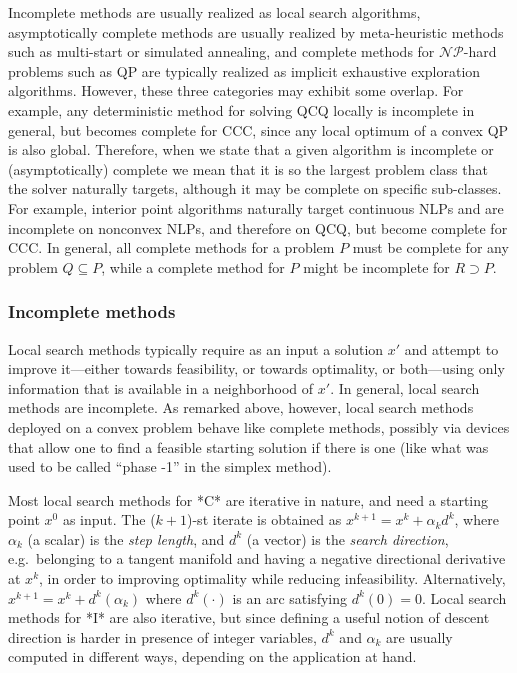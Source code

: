 Incomplete methods are usually realized as local search algorithms, asymptotically complete methods are usually realized by meta-heuristic methods such as multi-start or simulated annealing, and complete methods for $\mathcal{NP}$-hard problems such as QP are typically realized as implicit exhaustive exploration algorithms. However, these three categories may exhibit some overlap. For example, any deterministic method for solving QCQ locally is incomplete in general, but becomes complete for CCC, since any local optimum of a convex QP is also global. Therefore, when we state that a given algorithm is incomplete or (asymptotically) complete we mean that it is so the largest problem class that the solver naturally targets, although it may be complete on specific sub-classes. For example, interior point algorithms naturally target continuous NLPs and are incomplete on nonconvex NLPs, and therefore on QCQ, but become complete for CCC. In general, all complete methods for a problem $P$ must be complete for any problem $Q \subseteq P$, while a complete method for $P$ might be incomplete for $R \supset P$.



\subsubsection{Incomplete methods}\label{s:incomplete}

Local search methods typically require as an input a solution $x'$ and attempt to improve it---either towards feasibility, or towards optimality, or both---using only information that is available in a neighborhood of $x'$. In general, local search methods are incomplete. As remarked above, however, local search methods deployed on a convex problem behave like complete methods, possibly via devices that allow one to find a feasible starting solution if there is one (like what was used to be called ``phase -1'' in the simplex method).

Most local search methods for *C* are iterative in nature, and need a starting point $x^0$ as input. The ($k+1$)-st iterate is obtained as $x^{k+1} = x^k + \alpha_k d^k$, where $\alpha_k$ (a scalar) is the \emph{step length}, and $d^k$ (a vector) is the \emph{search direction}, e.g.~belonging to a tangent manifold and having a negative directional derivative at $x^k$, in order to improving optimality while reducing infeasibility. Alternatively, $x^{k+1} = x^k + d^k(\alpha_k)$ where $d^k(\cdot)$ is an arc satisfying $d^k(0) = 0$. Local search methods for *I* are also iterative, but since defining a useful notion of descent direction is harder in presence of integer variables, $d^k$ and $\alpha_k$ are usually computed in different ways, depending on the application at hand.


